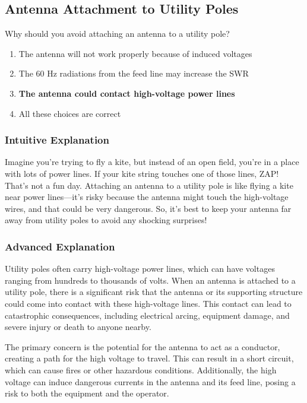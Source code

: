 \subsection{Antenna Attachment to Utility Poles}
\label{T0B09}

\begin{tcolorbox}[colback=gray!10!white,colframe=black!75!black,title=T0B09]
Why should you avoid attaching an antenna to a utility pole?
\begin{enumerate}[label=\Alph*)]
    \item The antenna will not work properly because of induced voltages
    \item The 60 Hz radiations from the feed line may increase the SWR
    \item \textbf{The antenna could contact high-voltage power lines}
    \item All these choices are correct
\end{enumerate}
\end{tcolorbox}

\subsubsection{Intuitive Explanation}
Imagine you’re trying to fly a kite, but instead of an open field, you’re in a place with lots of power lines. If your kite string touches one of those lines, ZAP! That’s not a fun day. Attaching an antenna to a utility pole is like flying a kite near power lines—it’s risky because the antenna might touch the high-voltage wires, and that could be very dangerous. So, it’s best to keep your antenna far away from utility poles to avoid any shocking surprises!

\subsubsection{Advanced Explanation}
Utility poles often carry high-voltage power lines, which can have voltages ranging from hundreds to thousands of volts. When an antenna is attached to a utility pole, there is a significant risk that the antenna or its supporting structure could come into contact with these high-voltage lines. This contact can lead to catastrophic consequences, including electrical arcing, equipment damage, and severe injury or death to anyone nearby.

The primary concern is the potential for the antenna to act as a conductor, creating a path for the high voltage to travel. This can result in a short circuit, which can cause fires or other hazardous conditions. Additionally, the high voltage can induce dangerous currents in the antenna and its feed line, posing a risk to both the equipment and the operator.

